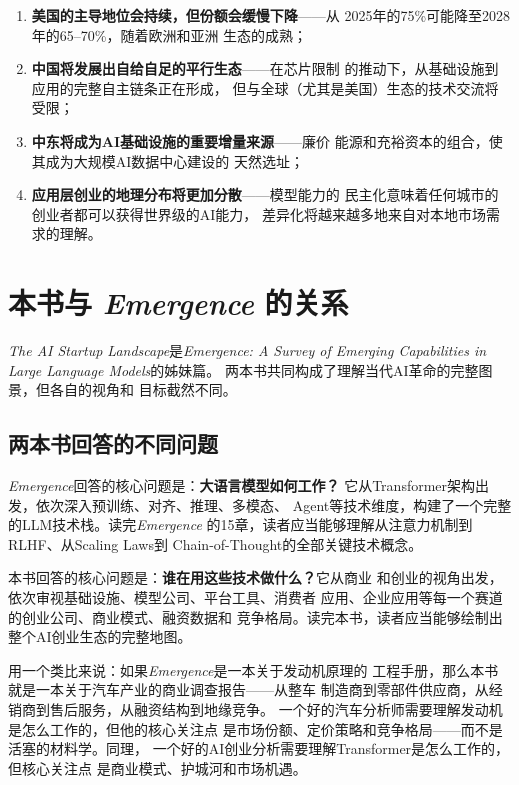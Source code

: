 \begin{enumerate}
  \item \textbf{美国的主导地位会持续，但份额会缓慢下降}——从
    2025年的75\%可能降至2028年的65--70\%，随着欧洲和亚洲
    生态的成熟；
  \item \textbf{中国将发展出自给自足的平行生态}——在芯片限制
    的推动下，从基础设施到应用的完整自主链条正在形成，
    但与全球（尤其是美国）生态的技术交流将受限；
  \item \textbf{中东将成为AI基础设施的重要增量来源}——廉价
    能源和充裕资本的组合，使其成为大规模AI数据中心建设的
    天然选址；
  \item \textbf{应用层创业的地理分布将更加分散}——模型能力的
    民主化意味着任何城市的创业者都可以获得世界级的AI能力，
    差异化将越来越多地来自对本地市场需求的理解。
\end{enumerate}


\section{本书与 \textit{Emergence} 的关系}
\label{sec:overview-emergence}

\textit{The AI Startup Landscape}是\textit{Emergence: A Survey
of Emerging Capabilities in Large Language Models}的姊妹篇。
两本书共同构成了理解当代AI革命的完整图景，但各自的视角和
目标截然不同。

\subsection{两本书回答的不同问题}

\textit{Emergence}回答的核心问题是：\textbf{大语言模型如何工作？}
它从Transformer架构出发，依次深入预训练、对齐、推理、多模态、
Agent等技术维度，构建了一个完整的LLM技术栈。读完\textit{Emergence}
的15章，读者应当能够理解从注意力机制到RLHF、从Scaling Laws到
Chain-of-Thought的全部关键技术概念。

本书回答的核心问题是：\textbf{谁在用这些技术做什么？}它从商业
和创业的视角出发，依次审视基础设施、模型公司、平台工具、消费者
应用、企业应用等每一个赛道的创业公司、商业模式、融资数据和
竞争格局。读完本书，读者应当能够绘制出整个AI创业生态的完整地图。

用一个类比来说：如果\textit{Emergence}是一本关于发动机原理的
工程手册，那么本书就是一本关于汽车产业的商业调查报告——从整车
制造商到零部件供应商，从经销商到售后服务，从融资结构到地缘竞争。
一个好的汽车分析师需要理解发动机是怎么工作的，但他的核心关注点
是市场份额、定价策略和竞争格局——而不是活塞的材料学。同理，
一个好的AI创业分析需要理解Transformer是怎么工作的，但核心关注点
是商业模式、护城河和市场机遇。

